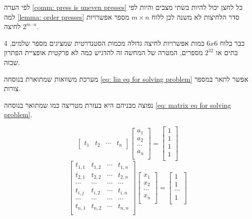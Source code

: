 \documentclass[12pt,twoside]{article}
\begin{document}
לפי הערה 
\ref{comm: press is uneven presses}
כל לחצן יכול להיות בשתי מצבים 
והיות לפי
למה
\ref{lemma: order presses}
סדר הלחיצות לא משנה 
לכן ללוח
$m \times n$
מספר אפשרויות לחיצה 
$2^{m \cdot n}$.

כבר בלוח 
$6x6$
כמות  אפשרויות לחיצה גדולה 
מכמות הסטנדרטית שמציגים מספר שלמים,
4 בתים או 
$2^{32}$
מספרים,
המטרה של המחשה זה להדגיש כמה לא פרקטית אופציית הפתרון שכזה.

מערכת משוואות 
שמתוארת בנוסחה
\ref{eq: lin eq for solving problem}
אפשר לתאר במספר צורות.

נפוצה מבניהם היא
בעזרת מטריצה כמו שמתואר 
בנוסחה 
\ref{eq: matrix eq for solving problem}.

\begin{equation*}
    \begin{bmatrix}
        t_1 & t_2 & \cdots & t_n
    \end{bmatrix}
    \begin{bmatrix}
        a_1 \\
        a_2 \\
        \cdots \\
        a_n \\
    \end{bmatrix}
    =
    \begin{bmatrix}
        1 \\
        1 \\
        1 \\
        1 \\
    \end{bmatrix}
\end{equation*}
\begin{equation}
    \label{eq: matrix eq for solving problem}
    \begin{bmatrix}
        t_{1,1} & t_{1,2} & \cdots & t_{1,n} \\
        t_{2,1} & t_{2,2} & \cdots & t_{2,n} \\
        \cdots & \cdots & \cdots & \cdots\\
        t_{i,j} & t_{i,2} & \cdots & t_{i,n} \\
        \cdots & \cdots & \cdots & \cdots\\
        t_{n,1} & t_{n,2} & \cdots & t_{n,n} \\
    \end{bmatrix}
    \begin{bmatrix}
        x_1 \\
        x_2 \\
        \cdots \\
        x_n \\
    \end{bmatrix}
    = 
    \begin{bmatrix}
        1 \\
        1 \\
        \cdots \\
        1 \\
    \end{bmatrix}
\end{equation}
\end{document}
